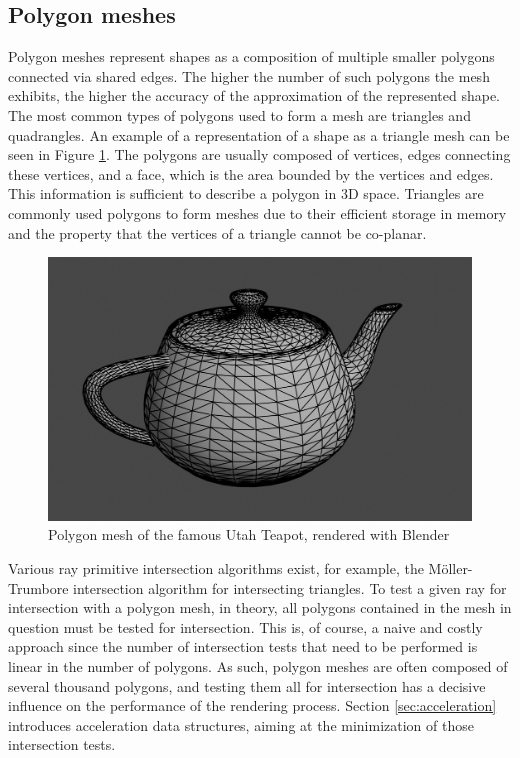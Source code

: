\subsection{Polygon meshes}

Polygon meshes represent shapes as a composition of multiple smaller polygons connected via shared edges. The higher the number of such polygons the mesh exhibits, the higher the accuracy of the approximation of the represented shape. The most common types of polygons used to form a mesh are triangles and quadrangles. An example of a representation of a shape as a triangle mesh can be seen in Figure \ref{fig:poly_mesh}. The polygons are usually composed of vertices, edges connecting these vertices, and a face, which is the area bounded by the vertices and edges. This information is sufficient to describe a polygon in 3D space. Triangles are commonly used polygons to form meshes due to their efficient storage in memory and the property that the vertices of a triangle cannot be co-planar.

\begin{figure}
	\centering
	\includegraphics[width=.8\linewidth]{img/1 fundamentals/poly_mesh.png}
	\caption{Polygon mesh of the famous Utah Teapot, rendered with Blender \cite{blender2018}}
	\label{fig:poly_mesh}
\end{figure}

Various ray primitive intersection algorithms exist, for example, the Möller-Trumbore intersection algorithm \cite{moller1997fast} for intersecting triangles. To test a given ray for intersection with a polygon mesh, in theory, all polygons contained in the mesh in question must be tested for intersection. This is, of course, a naive and costly approach since the number of intersection tests that need to be performed is linear in the number of polygons. As such, polygon meshes are often composed of several thousand polygons, and testing them all for intersection has a decisive influence on the performance of the rendering process. Section \ref{sec:acceleration} introduces acceleration data structures, aiming at the minimization of those intersection tests.

